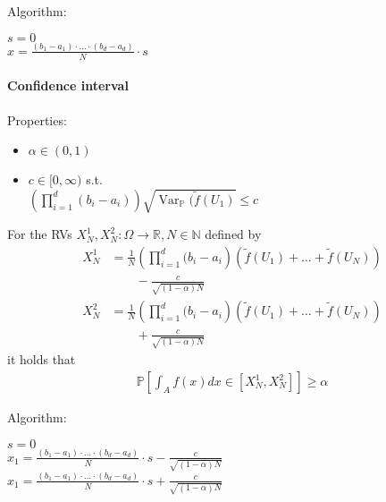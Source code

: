 \documentclass[a4paper,landscape,7pt,fleqn]{scrartcl}
\DeclareMathOperator{\Var}{Var}				%
\begin{document}
\begin{multicols*}{3}
Algorithm:
\begin{algorithm}[H]
$s = 0$ \\
$x = \frac{(b_1 - a_1) \cdot \ldots \cdot (b_d - a_d)}{N} \cdot s$
\end{algorithm}

\paragraph{Confidence interval}

Properties:
\begin{itemize}
\item $\alpha \in (0,1)$
\item $c \in [0,\infty)$ s.t. \\
$\left( \prod_{i=1}^d (b_i - a_i) \right) \sqrt{\Var_\mathbb{P}(\tilde f(U_1)} \leq c$
\end{itemize}

For the RVs $X_N^1, X_N^2: \Omega \rightarrow \mathbb{R}, N \in \mathbb{N}$ defined by
\begin{align*}
X_N^1 &= \frac{1}{N} \left( \prod_{i=1}^d (b_i - a_i \right) \left( \tilde f(U_1) + \ldots + \tilde f(U_N) \right) \\
& \qquad - \frac{c}{\sqrt{(1-\alpha)N}} \\
X_N^2 &= \frac{1}{N} \left( \prod_{i=1}^d (b_i - a_i \right) \left( \tilde f(U_1) + \ldots + \tilde f(U_N) \right) \\
& \qquad + \frac{c}{\sqrt{(1-\alpha)N}}
\end{align*}
it holds that
\begin{align*}
\mathbb{P} \left[ \int_A f(x) dx \in [X_N^1, X_N^2] \right] \geq \alpha
\end{align*}

Algorithm:
\begin{algorithm}[H]
$s = 0$ \\
$x_1 = \frac{(b_1 - a_1) \cdot \ldots \cdot (b_d - a_d)}{N} \cdot s - \frac{c}{\sqrt{(1-\alpha) N}}$ \\
$x_1 = \frac{(b_1 - a_1) \cdot \ldots \cdot (b_d - a_d)}{N} \cdot s + \frac{c}{\sqrt{(1-\alpha) N}}$
\end{algorithm}


\end{multicols*}
\end{document}
